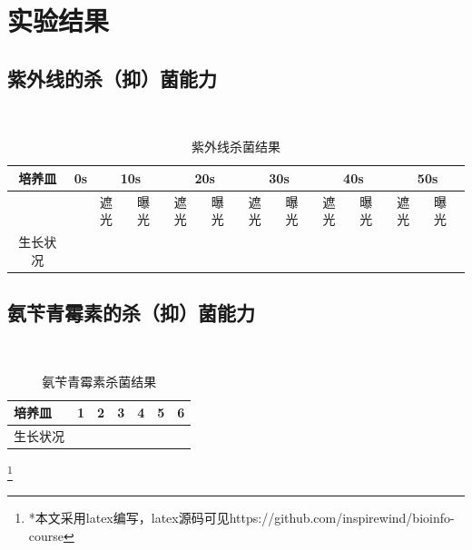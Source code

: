 \documentclass[UTF8]{ctexart}
\begin{document}
    \section{实验结果}
    \subsection{紫外线的杀（抑）菌能力}
    \
    \\
    \begin{table}[h]
        \centering
        \caption{紫外线杀菌结果}
        \begin{tabular}{clllllllllll}
        \hline
        培养皿                  & \multicolumn{1}{c}{\quad 0s \qquad} & \multicolumn{2}{c}{10s} & \multicolumn{2}{c}{20s} & \multicolumn{2}{c}{30s} & \multicolumn{2}{c}{40s} & \multicolumn{2}{c}{50s} \\ \hline
        \multicolumn{1}{l}{} &                                                                  & 遮光         & 曝光         & 遮光         & 曝光         & 遮光         & 曝光         & 遮光         & 曝光         & 遮光         & 曝光         \\ \cline{3-12} 
        生长状况                 &                                                                  & \multicolumn{2}{l}{}    & \multicolumn{2}{l}{}    & \multicolumn{2}{l}{}    & \multicolumn{2}{l}{}    & \multicolumn{2}{l}{}    \\ \hline
        \end{tabular}
    \end{table}

    \subsection{氨苄青霉素的杀（抑）菌能力}
    \
    \\
    \begin{table}[h]
        \centering
        \caption{氨苄青霉素杀菌结果}
        \begin{tabular}{lllllll}
        \hline
        培养皿\  & \multicolumn{1}{c}{1} & \multicolumn{1}{c}{2} & \multicolumn{1}{c}{3} & \multicolumn{1}{c}{4} & \multicolumn{1}{c}{5} & \multicolumn{1}{c}{6} \\ \hline
        生长状况 & \qquad\qquad\qquad & \qquad\qquad\qquad & \qquad\qquad\qquad & \qquad\qquad\qquad & \qquad\qquad\qquad & \qquad\qquad\qquad \\ \hline
        \end{tabular}
        \end{table}
    \footnote{*本文采用latex编写，latex源码可见https://github.com/inspirewind/bioinfo-course}
\end{document}
